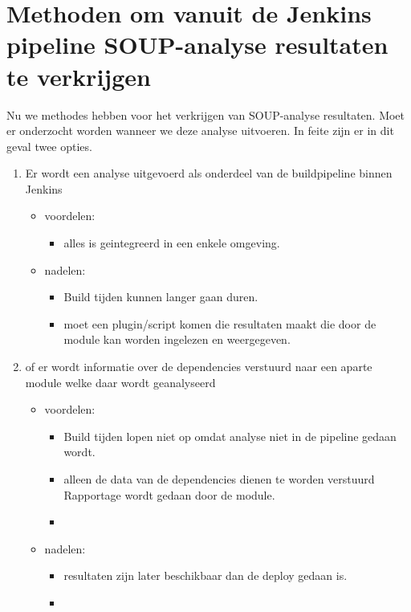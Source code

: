 \section{Methoden om vanuit de Jenkins pipeline SOUP-analyse resultaten te verkrijgen}\label{sec:methoden-om-vanuit-de-jenkins-pipeline-soup-analyse-resultaten-te-verkrijgen}
Nu we methodes hebben voor het verkrijgen van SOUP-analyse resultaten. Moet er onderzocht worden wanneer we deze analyse uitvoeren. In feite zijn er in dit geval twee opties.
\begin{enumerate}
    \item Er wordt een analyse uitgevoerd als onderdeel van de buildpipeline binnen Jenkins
    \begin{itemize}
        \item voordelen:
        \begin{itemize}
            \item alles is geintegreerd in een enkele omgeving.
        \end{itemize}
        \item nadelen:
        \begin{itemize}
            \item Build tijden kunnen langer gaan duren.
            \item moet een plugin/script komen die resultaten maakt die door de module kan worden ingelezen en weergegeven.
        \end{itemize}
    \end{itemize}
    \item of er wordt informatie over de dependencies verstuurd naar een aparte module welke daar wordt geanalyseerd
    \begin{itemize}
        \item voordelen:
        \begin{itemize}
            \item Build tijden lopen niet op omdat analyse niet in de pipeline gedaan wordt.
            \item alleen de data van de dependencies dienen te worden verstuurd Rapportage wordt gedaan door de module.
            \item
        \end{itemize}
        \item nadelen:
        \begin{itemize}
            \item resultaten zijn later beschikbaar dan de deploy gedaan is.
            \item
        \end{itemize}
    \end{itemize}
\end{enumerate}



